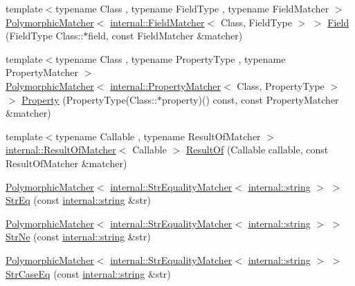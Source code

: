 \begin{DoxyCompactItemize}
\item 
{\footnotesize template$<$typename Class , typename Field\+Type , typename Field\+Matcher $>$ }\\\hyperlink{classtesting_1_1PolymorphicMatcher}{Polymorphic\+Matcher}$<$ \hyperlink{classtesting_1_1internal_1_1FieldMatcher}{internal\+::\+Field\+Matcher}$<$ Class, Field\+Type $>$ $>$ \hyperlink{namespacetesting_a4df3849391696aa93ac3a7703a717c2a}{Field} (Field\+Type Class\+::$\ast$field, const Field\+Matcher \&matcher)
\item 
{\footnotesize template$<$typename Class , typename Property\+Type , typename Property\+Matcher $>$ }\\\hyperlink{classtesting_1_1PolymorphicMatcher}{Polymorphic\+Matcher}$<$ \hyperlink{classtesting_1_1internal_1_1PropertyMatcher}{internal\+::\+Property\+Matcher}$<$ Class, Property\+Type $>$ $>$ \hyperlink{namespacetesting_a0fad10571e23f7bc0d5c83d4c31ba740}{Property} (Property\+Type(Class\+::$\ast$property)() const, const Property\+Matcher \&matcher)
\item 
{\footnotesize template$<$typename Callable , typename Result\+Of\+Matcher $>$ }\\\hyperlink{classtesting_1_1internal_1_1ResultOfMatcher}{internal\+::\+Result\+Of\+Matcher}$<$ Callable $>$ \hyperlink{namespacetesting_aaadb51dd383baa95f123ab891d4f8a5f}{Result\+Of} (Callable callable, const Result\+Of\+Matcher \&matcher)
\item 
\hyperlink{classtesting_1_1PolymorphicMatcher}{Polymorphic\+Matcher}$<$ \hyperlink{classtesting_1_1internal_1_1StrEqualityMatcher}{internal\+::\+Str\+Equality\+Matcher}$<$ \hyperlink{namespacetesting_1_1internal_a8e8ff5b11e64078831112677156cb111}{internal\+::string} $>$ $>$ \hyperlink{namespacetesting_a154de81376ae7d584c6e5a619b45fb09}{Str\+Eq} (const \hyperlink{namespacetesting_1_1internal_a8e8ff5b11e64078831112677156cb111}{internal\+::string} \&str)
\item 
\hyperlink{classtesting_1_1PolymorphicMatcher}{Polymorphic\+Matcher}$<$ \hyperlink{classtesting_1_1internal_1_1StrEqualityMatcher}{internal\+::\+Str\+Equality\+Matcher}$<$ \hyperlink{namespacetesting_1_1internal_a8e8ff5b11e64078831112677156cb111}{internal\+::string} $>$ $>$ \hyperlink{namespacetesting_a6f6b8af3d19cb969df0eb995c47a14d2}{Str\+Ne} (const \hyperlink{namespacetesting_1_1internal_a8e8ff5b11e64078831112677156cb111}{internal\+::string} \&str)
\item 
\hyperlink{classtesting_1_1PolymorphicMatcher}{Polymorphic\+Matcher}$<$ \hyperlink{classtesting_1_1internal_1_1StrEqualityMatcher}{internal\+::\+Str\+Equality\+Matcher}$<$ \hyperlink{namespacetesting_1_1internal_a8e8ff5b11e64078831112677156cb111}{internal\+::string} $>$ $>$ \hyperlink{namespacetesting_addbdb8c0902ab09cade24fa6db7c0073}{Str\+Case\+Eq} (const \hyperlink{namespacetesting_1_1internal_a8e8ff5b11e64078831112677156cb111}{internal\+::string} \&str)

\end{DoxyCompactItemize}
